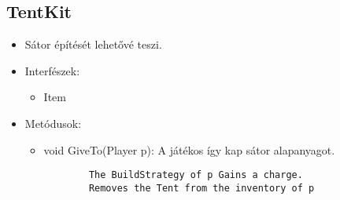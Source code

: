 \subsection{TentKit}
\begin{itemize}
	\item Sátor építését lehetővé teszi.
	\item Interfészek:
	\begin{itemize}
		\item Item
	\end{itemize}
	\item Metódusok:
	\begin{itemize}
		\item void GiveTo(Player p): A játékos így kap sátor alapanyagot.
		\begin{lstlisting}
		The BuildStrategy of p Gains a charge.
		Removes the Tent from the inventory of p
		\end{lstlisting}
	\end{itemize}
\end{itemize}

